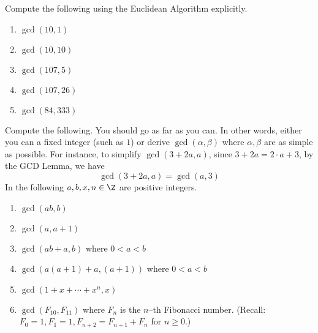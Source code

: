 \begin{ex}
  Compute the following using the Euclidean Algorithm explicitly.
  \begin{enumerate}[nosep,label=\textnormal{(\alph*)}]
  \item $\gcd(10, 1)$
  \item $\gcd(10, 10)$
  \item $\gcd(107, 5)$
  \item $\gcd(107, 26)$
  \item $\gcd(84, 333)$
  \end{enumerate}
\end{ex}

\begin{ex}
  Compute the following.
  You should go as far as you can.
  In other words, either you can a fixed integer (such as $1$) or
  derive $\gcd(\alpha, \beta)$ where $\alpha, \beta$ are
  as simple as possible.
  For instance, to simplify $\gcd(3 + 2a, a)$, since $3 + 2a = 2 \cdot a + 3$,
  by the GCD Lemma, we have
  \[
  \gcd(3 + 2a, a) = \gcd(a, 3)
  \]
  In the following $a, b, x, n \in \Z$ are positive integers.
  \begin{enumerate}[nosep,label=\textnormal{(\alph*)}]
  \item $\gcd(ab, b)$
  \item $\gcd(a, a + 1)$
  \item $\gcd(ab + a, b)$ where $0 < a < b$
  \item $\gcd(a(a+1) + a, (a+1))$ where $0 < a < b$
  \item $\gcd(1 + x + \cdots + x^n, x)$
  \item $\gcd(F_{10}, F_{11})$ where $F_n$ is the $n$--th Fibonacci number.
    (Recall: $F_0 = 1, F_1 = 1, F_{n + 2} = F_{n + 1} + F_n$ for $n \geq 0$.)
  \end{enumerate}
\end{ex}

